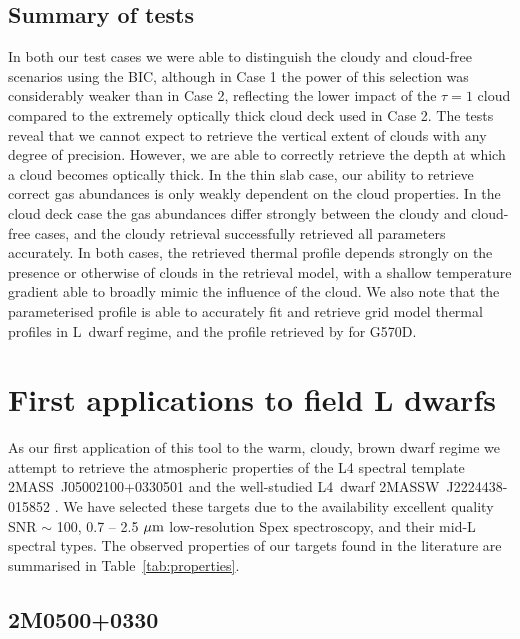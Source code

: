 \documentclass[useAMS,usenatbib]{mn2e}
\begin{document}
\subsection{Summary of tests}

In both our test cases we were able to distinguish the cloudy and cloud-free scenarios using the BIC, although in Case 1 the power of this selection was considerably weaker than in Case 2, reflecting the lower impact of the $\tau = 1$ cloud compared to the extremely optically thick cloud deck used in Case 2. The tests reveal that we cannot expect to retrieve the vertical extent of clouds with any degree of precision. However, we are able to correctly retrieve the depth at which a cloud becomes optically thick. In the thin slab case, our ability to retrieve correct gas abundances is only weakly dependent on the cloud properties. In the cloud deck case the gas abundances differ strongly between the cloudy and cloud-free cases, and the cloudy retrieval successfully retrieved all parameters accurately. In both cases, the retrieved thermal profile depends strongly on the presence or otherwise of clouds in the retrieval model, with a shallow temperature gradient able to broadly mimic the influence of the cloud.  We also note that the parameterised profile is able to accurately fit and retrieve grid model thermal profiles in L~dwarf regime, and the profile retrieved by \citet{line2015} for G570D.



\section{First applications to field L dwarfs}
\label{sec:2m2224}
As our first application of this tool to the warm, cloudy, brown dwarf regime we attempt to retrieve the atmospheric properties of the L4 spectral template 2MASS~J05002100+0330501 \citep[2M0500+0330; ][]{reid2008} and the well-studied L4~dwarf 2MASSW~J2224438-015852 \citep[2MASS2224-0158; ][]{kirkpatrick2000}. We have selected these targets due to the availability excellent quality SNR $\sim$ 100,  0.7 -- 2.5 $\hbox{$\mu$m}$ low-resolution Spex \citep{spex} spectroscopy, and their mid-L spectral types. The observed properties of our targets found in the literature are summarised in Table~\ref{tab:properties}.


\subsection{2M0500+0330}
\end{document}
